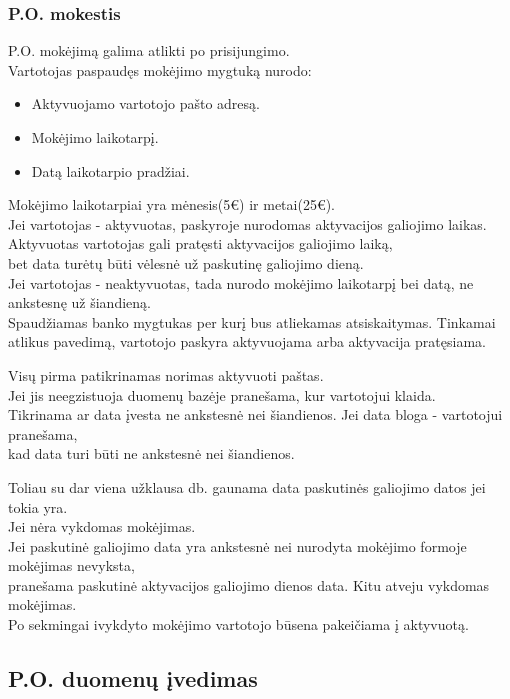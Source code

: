\documentclass[a4paper,12pt]{article}
\begin{document}
\subsubsection{P.O. mokestis}
P.O. mokėjimą galima atlikti po prisijungimo. \\
Vartotojas paspaudęs mokėjimo mygtuką nurodo:
\begin{itemize}
	\item Aktyvuojamo vartotojo pašto adresą.
	\item Mokėjimo laikotarpį.
	\item Datą laikotarpio pradžiai.
\end{itemize} 
Mokėjimo laikotarpiai yra mėnesis(5€) ir metai(25€). \\
Jei vartotojas - aktyvuotas, paskyroje nurodomas aktyvacijos galiojimo laikas.\\
Aktyvuotas vartotojas gali pratęsti aktyvacijos galiojimo laiką, \\
bet data turėtų būti vėlesnė už paskutinę galiojimo dieną.\\
Jei vartotojas - neaktyvuotas, tada nurodo mokėjimo laikotarpį bei datą,
ne ankstesnę už šiandieną. \\
Spaudžiamas banko mygtukas per kurį bus atliekamas atsiskaitymas.
Tinkamai atlikus pavedimą, vartotojo paskyra aktyvuojama arba aktyvacija pratęsiama.

Visų pirma patikrinamas norimas aktyvuoti paštas. \\
Jei jis neegzistuoja duomenų bazėje pranešama, kur vartotojui klaida.\\

Tikrinama ar data įvesta ne ankstesnė nei šiandienos. Jei data bloga - vartotojui pranešama, \\
kad data turi būti ne ankstesnė nei šiandienos.

Toliau su dar viena užklausa db. gaunama data paskutinės galiojimo datos jei tokia yra. \\
Jei nėra vykdomas mokėjimas. \\
Jei paskutinė galiojimo data yra ankstesnė nei nurodyta mokėjimo formoje mokėjimas nevyksta, \\
pranešama paskutinė aktyvacijos galiojimo dienos data. Kitu atveju vykdomas mokėjimas. \\

Po sekmingai ivykdyto mokėjimo vartotojo būsena pakeičiama į aktyvuotą.
 
	
	
\subsection{ P.O. duomenų įvedimas }
\end{document}
